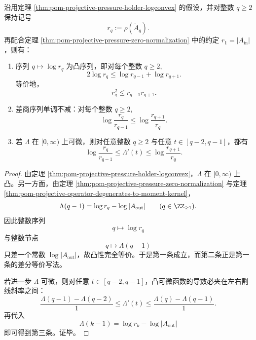 
\begin{corollary}\label{cor:pom-projective-pressure-discrete-convexity-slopes}
沿用定理 \ref{thm:pom-projective-pressure-holder-logconvex} 的假设，并对整数 \(q\ge 2\) 保持记号
\[
r_q:=\rho(\widetilde A_q).
\]
再配合定理 \ref{thm:pom-projective-pressure-zero-normalization} 中的约定 \(r_1=|A_{\mathrm{in}}|\)，则有：
\begin{enumerate}
  \item 序列 \(q\mapsto \log r_q\) 为凸序列，即对每个整数 \(q\ge 2\),
  \[
  \boxed{\;
  2\log r_q\le \log r_{q-1}+\log r_{q+1}.\;}
  \]
  等价地，
  \[
  \boxed{\;r_q^2\le r_{q-1}r_{q+1}.\;}
  \]
  \item 差商序列单调不减：对每个整数 \(q\ge 2\),
  \[
  \boxed{\;
  \log\frac{r_q}{r_{q-1}}
  \le
  \log\frac{r_{q+1}}{r_q}.\;}
  \]
  \item 若 \(\Lambda\) 在 \([0,\infty)\) 上可微，则对任意整数 \(q\ge 2\) 与任意 \(t\in[q-2,q-1]\)，都有
  \[
  \boxed{\;
  \log\frac{r_q}{r_{q-1}}
  \le
  \Lambda'(t)
  \le
  \log\frac{r_{q+1}}{r_q}.\;}
  \]
\end{enumerate}
\end{corollary}
\begin{proof}
由定理 \ref{thm:pom-projective-pressure-holder-logconvex}，\(\Lambda\) 在 \([0,\infty)\) 上凸。另一方面，由定理 \ref{thm:pom-projective-pressure-zero-normalization} 与定理 \ref{thm:pom-projective-operator-degenerates-to-moment-kernel}，
\[
\Lambda(q-1)=\log r_q-\log|A_{\mathrm{out}}|
\qquad(q\in\ZZ_{\ge 1}).
\]
因此整数序列
\[
q\longmapsto \log r_q
\]
与整数节点
\[
q\longmapsto \Lambda(q-1)
\]
只差一个常数 \(\log|A_{\mathrm{out}}|\)，故凸性完全等价。于是第一条成立，而第二条正是第一条的差分等价写法。

若进一步 \(\Lambda\) 可微，则对任意 \(t\in[q-2,q-1]\)，凸可微函数的导数必夹在左右割线斜率之间：
\[
\frac{\Lambda(q-1)-\Lambda(q-2)}{1}
\le
\Lambda'(t)
\le
\frac{\Lambda(q)-\Lambda(q-1)}{1}.
\]
再代入
\[
\Lambda(k-1)=\log r_k-\log|A_{\mathrm{out}}|
\]
即可得到第三条。证毕。
\end{proof}

